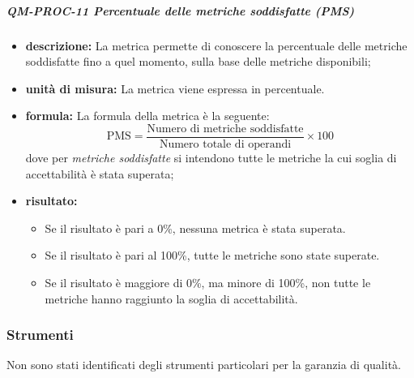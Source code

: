 		\subparagraph{QM-PROC-11 Percentuale delle metriche soddisfatte (PMS)}
            \begin{itemize}
                \item \textbf{descrizione: }
                    La metrica permette di conoscere la percentuale delle metriche soddisfatte fino a quel momento, sulla base delle metriche disponibili;

                \item \textbf{unità di misura: }
                La metrica viene espressa in percentuale.

                \item \textbf{formula: }
                La formula della metrica è la seguente:
                \[
                    \text{PMS} = \frac{\text{Numero di metriche soddisfatte}}{\text{Numero totale di operandi}} \times 100
                \]
                dove per \textit{metriche soddisfatte} si intendono tutte le metriche la cui soglia di accettabilità è stata superata;

                \item \textbf{risultato: }
                \begin{itemize}
                    \item Se il risultato è pari a 0\%, nessuna metrica è stata superata.
                    \item Se il risultato è pari al 100\%, tutte le metriche sono state superate.
                    \item Se il risultato è maggiore di 0\%, ma minore di 100\%, non tutte le metriche hanno raggiunto la soglia di accettabilità.
                \end{itemize}
            \end{itemize}

	\subsubsection{Strumenti}

	Non sono stati identificati degli strumenti particolari per la garanzia di qualità.






		
